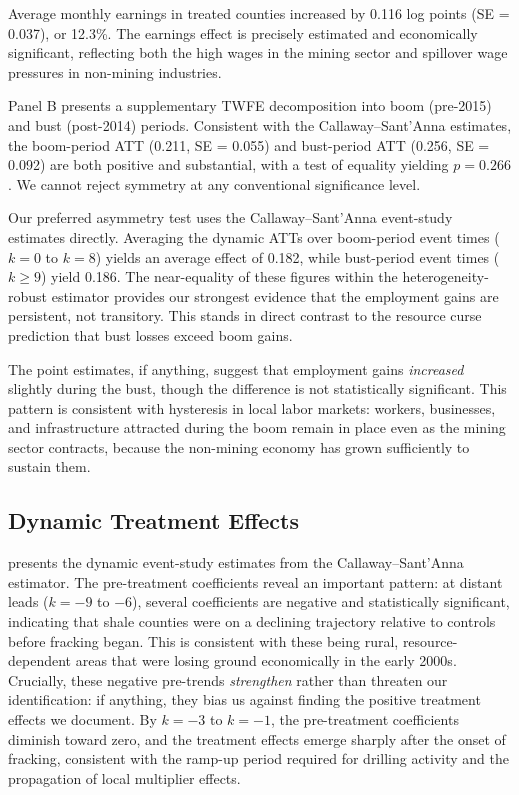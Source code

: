\documentclass[12pt]{article}
\begin{document}
Average monthly earnings in treated counties increased by 0.116 log points (SE = 0.037), or 12.3\%. The earnings effect is precisely estimated and economically significant, reflecting both the high wages in the mining sector and spillover wage pressures in non-mining industries.

Panel B presents a supplementary TWFE decomposition into boom (pre-2015) and bust (post-2014) periods. Consistent with the Callaway--Sant'Anna estimates, the boom-period ATT (0.211, SE = 0.055) and bust-period ATT (0.256, SE = 0.092) are both positive and substantial, with a test of equality yielding $p = 0.266$. We cannot reject symmetry at any conventional significance level.

Our preferred asymmetry test uses the Callaway--Sant'Anna event-study estimates directly. Averaging the dynamic ATTs over boom-period event times ($k = 0$ to $k = 8$) yields an average effect of 0.182, while bust-period event times ($k \geq 9$) yield 0.186. The near-equality of these figures within the heterogeneity-robust estimator provides our strongest evidence that the employment gains are persistent, not transitory. This stands in direct contrast to the resource curse prediction that bust losses exceed boom gains.

The point estimates, if anything, suggest that employment gains \emph{increased} slightly during the bust, though the difference is not statistically significant. This pattern is consistent with hysteresis in local labor markets: workers, businesses, and infrastructure attracted during the boom remain in place even as the mining sector contracts, because the non-mining economy has grown sufficiently to sustain them.



\subsection{Dynamic Treatment Effects}

 presents the dynamic event-study estimates from the Callaway--Sant'Anna estimator. The pre-treatment coefficients reveal an important pattern: at distant leads ($k = -9$ to $-6$), several coefficients are negative and statistically significant, indicating that shale counties were on a declining trajectory relative to controls before fracking began. This is consistent with these being rural, resource-dependent areas that were losing ground economically in the early 2000s. Crucially, these negative pre-trends \emph{strengthen} rather than threaten our identification: if anything, they bias us against finding the positive treatment effects we document. By $k = -3$ to $k = -1$, the pre-treatment coefficients diminish toward zero, and the treatment effects emerge sharply after the onset of fracking, consistent with the ramp-up period required for drilling activity and the propagation of local multiplier effects.
\end{document}
